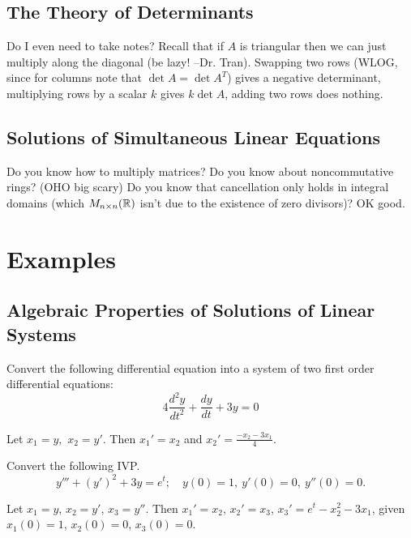 \subsection{The Theory of Determinants}
Do I even need to take notes? Recall that if $A$ is triangular then we can just multiply along the diagonal (be lazy! –Dr. Tran). Swapping two rows (WLOG, since for columns note that $\det A= \det A^T$) gives a negative determinant, multiplying rows by a scalar $k$ gives $k\det A$, adding two rows does nothing.

\subsection{Solutions of Simultaneous Linear Equations}
Do you know how to multiply matrices? Do you know about noncommutative rings? (OHO big scary) Do you know that cancellation only holds in integral domains (which $M_{n\times n}(\mathbb{R})$ isn't due to the existence of zero divisors)? OK good.


\section{Examples}

\subsection{Algebraic Properties of Solutions of Linear Systems}
\begin{prob}
    Convert the following differential equation into a system of two first order differential equations: \[
    4 \frac{d^2y}{dt^2}+\frac{dy}{dt}+3y=0
    \] 
\end{prob}
\begin{solution}
    Let $x_1=y,$ $x_2=y'$. Then $x_1'=x_2$ and $x_2'=\frac{-x_2-3x_1}{4}$.
\end{solution}
\begin{prob}
    Convert the following IVP.
    \[
        y'''+(y')^2+3y=e^t; \quad y(0)=1, \ y'(0)=0, \ y''(0)=0.
    \] 
\end{prob}
\begin{solution}
    Let $x_1=y$, $x_2=y'$, $x_3=y''$. Then $x_1'=x_2$, $x_2'=x_3$, $x_3'=e^t-x_2^2-3x_1$, given $x_1(0)=1$, $x_2(0)=0$, $x_3(0)=0$.
\end{solution}

